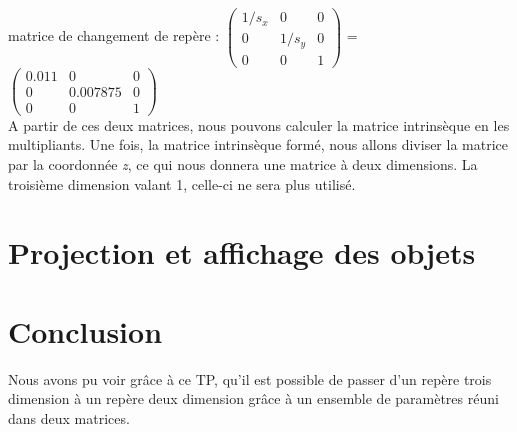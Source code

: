 \documentclass[a4paper,11pt]{article}
\begin{document}
  matrice de changement de repère : 
   $\begin{pmatrix}
     1/s_x & 0 & 0\\  
     0 & 1/s_y & 0\\  
     0 & 0 & 1 
     \end{pmatrix}$ = 
   $\begin{pmatrix}
     0.011 & 0 & 0\\  
     0 & 0.007875 & 0\\  
     0 & 0 & 1 
     \end{pmatrix}$\\
     
  A partir de ces deux matrices, nous pouvons calculer la matrice intrinsèque en les multipliants.
  Une fois, la matrice intrinsèque formé, nous allons diviser la matrice par la coordonnée \textit{z},
  ce qui nous donnera une matrice à deux dimensions. La troisième dimension valant 1, celle-ci ne sera
  plus utilisé.
     
  \section{Projection et affichage des objets}
  
  
  \section*{Conclusion}
  Nous avons pu voir grâce à ce TP, qu'il est possible de passer d'un repère trois dimension à un repère deux
  dimension grâce à un ensemble de paramètres réuni dans deux matrices.
    
\end{document}
